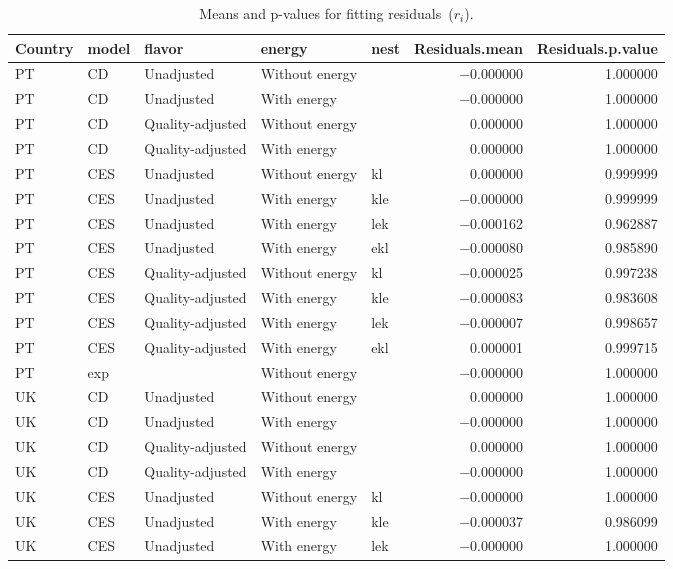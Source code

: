 \documentclass[preprint,authoryear,12pt]{elsarticle}\usepackage[]{graphicx}\usepackage[]{color}
\begin{document}
\begin{table}[ht]
\centering
\caption{Means and p-values for fitting residuals~($r_i$).} 
\label{tab:r_p_values}
{\tiny
\begin{tabular}{lllllrr}
  \hline
Country & model & flavor & energy & nest & Residuals.mean & Residuals.p.value \\ 
  \hline
PT & CD & Unadjusted & Without energy &  & $-$0.000000 & 1.000000 \\ 
  PT & CD & Unadjusted & With energy &  & $-$0.000000 & 1.000000 \\ 
  PT & CD & Quality-adjusted & Without energy &  & 0.000000 & 1.000000 \\ 
  PT & CD & Quality-adjusted & With energy &  & 0.000000 & 1.000000 \\ 
  PT & CES & Unadjusted & Without energy & kl & 0.000000 & 0.999999 \\ 
  PT & CES & Unadjusted & With energy & kle & $-$0.000000 & 0.999999 \\ 
  PT & CES & Unadjusted & With energy & lek & $-$0.000162 & 0.962887 \\ 
  PT & CES & Unadjusted & With energy & ekl & $-$0.000080 & 0.985890 \\ 
  PT & CES & Quality-adjusted & Without energy & kl & $-$0.000025 & 0.997238 \\ 
  PT & CES & Quality-adjusted & With energy & kle & $-$0.000083 & 0.983608 \\ 
  PT & CES & Quality-adjusted & With energy & lek & $-$0.000007 & 0.998657 \\ 
  PT & CES & Quality-adjusted & With energy & ekl & 0.000001 & 0.999715 \\ 
  PT & exp &  & Without energy &  & $-$0.000000 & 1.000000 \\ 
  UK & CD & Unadjusted & Without energy &  & 0.000000 & 1.000000 \\ 
  UK & CD & Unadjusted & With energy &  & $-$0.000000 & 1.000000 \\ 
  UK & CD & Quality-adjusted & Without energy &  & 0.000000 & 1.000000 \\ 
  UK & CD & Quality-adjusted & With energy &  & $-$0.000000 & 1.000000 \\ 
  UK & CES & Unadjusted & Without energy & kl & $-$0.000000 & 1.000000 \\ 
  UK & CES & Unadjusted & With energy & kle & $-$0.000037 & 0.986099 \\ 
  UK & CES & Unadjusted & With energy & lek & $-$0.000000 & 1.000000 \\ 

\end{tabular}}
\end{table}
\end{document}
